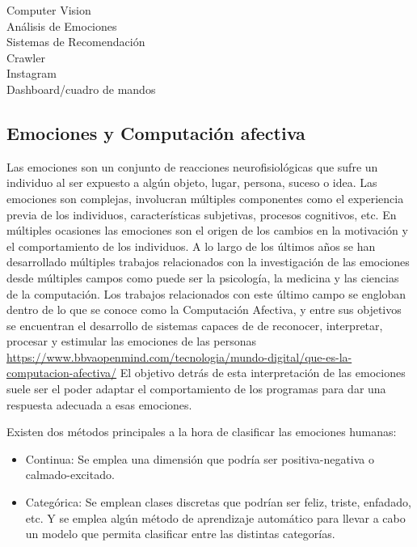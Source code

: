 

Computer Vision\\
Análisis de Emociones\\
Sistemas de Recomendación\\
Crawler\\
Instagram\\
Dashboard/cuadro de mandos\\









\subsection{Emociones y Computación afectiva}

Las emociones son un conjunto de reacciones neurofisiológicas que sufre un individuo al ser expuesto a algún objeto, lugar, persona, suceso o idea. Las emociones son complejas, involucran múltiples componentes como el experiencia previa de los individuos, características subjetivas, procesos cognitivos, etc. En múltiples ocasiones las emociones son el origen de los cambios en la motivación y el comportamiento de los individuos. A lo largo de los últimos años se han desarrollado múltiples trabajos relacionados con la investigación de las emociones desde múltiples campos como puede ser la psicología, la medicina y las ciencias de la computación. Los trabajos relacionados con este último campo se engloban dentro de lo que se conoce como la Computación Afectiva, y entre sus objetivos se encuentran el desarrollo de sistemas capaces de de reconocer, interpretar, procesar y estimular las emociones de las personas \url{https://www.bbvaopenmind.com/tecnologia/mundo-digital/que-es-la-computacion-afectiva/} El objetivo detrás de esta interpretación de las emociones suele ser el poder adaptar el comportamiento de los programas para dar una respuesta adecuada a esas emociones.

Existen dos métodos principales a la hora de clasificar las emociones humanas:
\begin{itemize}
    \item Continua: Se emplea una dimensión que podría ser positiva-negativa o calmado-excitado.
    \item Categórica: Se emplean clases discretas que podrían ser feliz, triste, enfadado, etc. Y se emplea algún método de aprendizaje automático para llevar a cabo un modelo que permita clasificar entre las distintas categorías.
\end{itemize}

